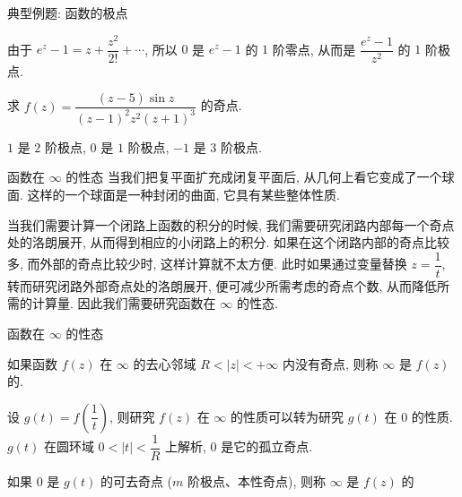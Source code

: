 \begin{frame}{典型例题: 函数的极点}
\begin{solution}
由于 $e^z-1=z+\dfrac{z^2}{2!}+\cdots$,
\onslide<+->
所以 $0$ 是 $e^z-1$ 的 $1$ 阶零点,
\onslide<+->
从而是 $\dfrac{e^z-1}{z^2}$ 的 $1$ 阶极点.
\end{solution}

\begin{exercise}
求 $f(z)=\dfrac{(z-5)\sin z}{(z-1)^2z^2(z+1)^3}$ 的奇点.
\end{exercise}
\begin{answer}
$1$ 是 $2$ 阶极点, $0$ 是 $1$ 阶极点, $-1$ 是 $3$ 阶极点.
\end{answer}
\end{frame}


\begin{frame}{函数在 $\infty$ 的性态}
\onslide<+->
当我们把复平面扩充成闭复平面后, 从几何上看它变成了一个球面.
\onslide<+->
这样的一个球面是一种封闭的曲面, 它具有某些整体性质.

\onslide<+->
当我们需要计算一个闭路上函数的积分的时候,
\onslide<+->
我们需要研究闭路内部每一个奇点处的洛朗展开,
\onslide<+->
从而得到相应的小闭路上的积分.
\onslide<+->
如果在这个闭路内部的奇点比较多, 而外部的奇点比较少时, 这样计算就不太方便.
\onslide<+->
此时如果通过变量替换 $z=\dfrac1t$, 转而研究闭路外部奇点处的洛朗展开,\onslide<+->
便可减少所需考虑的奇点个数, 从而降低所需的计算量.
\onslide<+->
因此我们需要研究函数在 $\infty$ 的性态.
\end{frame}


\begin{frame}{函数在 $\infty$ 的性态}
\begin{definition}
如果函数 $f(z)$ 在 $\infty$ 的去心邻域 $R<|z|<+\infty$ 内没有奇点, 则称 $\infty$ 是 $f(z)$ 的.
\end{definition}
\onslide<+->
设 $g(t)=f\left(\dfrac1t\right)$, 则研究 $f(z)$ 在 $\infty$ 的性质可以转为研究 $g(t)$ 在 $0$ 的性质.
\onslide<+->
$g(t)$ 在圆环域 $0<|t|<\dfrac1R$ 上解析, $0$ 是它的孤立奇点.
\begin{definition}
如果 $0$ 是 $g(t)$ 的可去奇点 ($m$ 阶极点、本性奇点), 则称 $\infty$ 是 $f(z)$ 的
\end{definition}
\end{frame}


